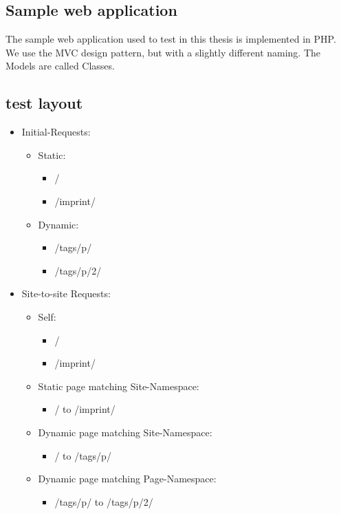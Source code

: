 \subsection{Sample web application}

The sample web application used to test \lare{} in this thesis is implemented in PHP.
We use the MVC design pattern, but with a slightly different naming.
The Models are called Classes.


\subsection{test layout}

\begin{itemize}
\item Initial-Requests:
\begin{itemize}
  \item Static:
    \begin{itemize}
      \item /
      \item /imprint/
    \end{itemize}
    \item Dynamic:
    \begin{itemize}
      \item /tags/p/
      \item /tags/p/2/
    \end{itemize}
\end{itemize}

\newpage{}
\item Site-to-site Requests:

\begin{itemize}
  \item Self:
    \begin{itemize}
      \item /
      \item /imprint/
    \end{itemize}
  \item Static page matching Site-Namespace:
    \begin{itemize}
      \item / to /imprint/
    \end{itemize}
  \item Dynamic page matching Site-Namespace:
    \begin{itemize}
      \item / to /tags/p/
    \end{itemize}
  \item Dynamic page matching Page-Namespace:
    \begin{itemize}
      \item /tags/p/ to /tags/p/2/
    \end{itemize}
\end{itemize}
\end{itemize}

